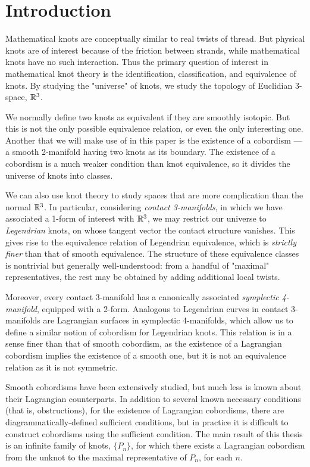 \chapter{Introduction}

Mathematical knots are conceptually similar to real twists of thread. But physical knots are of interest because of the friction between strands, while mathematical knots have no such interaction. Thus the primary question of interest in mathematical knot theory is the identification, classification, and equivalence of knots. By studying the "universe" of knots, we study the topology of Euclidian 3-space, $\mathbb{R}^3$.

We normally define two knots as equivalent if they are smoothly isotopic. But this is not the only possible equivalence relation, or even the only interesting one. Another that we will make use of in this paper is the existence of a cobordism --- a smooth 2-manifold having two knots as its boundary. The existence of a cobordism is a much weaker condition than knot equivalence, so it divides the universe of knots into classes.

We can also use knot theory to study spaces that are more complication than the normal $\mathbb{R}^3$. In particular, considering \emph{contact 3-manifolds}, in which we have associated a 1-form of interest with $\mathbb{R}^3$, we may restrict our universe to \emph{Legendrian} knots, on whose tangent vector the contact structure vanishes. This gives rise to the equivalence relation of Legendrian equivalence, which is \emph{strictly finer} than that of smooth equivalence. The structure of these equivalence classes is nontrivial but generally well-understood: from a handful of "maximal" representatives, the rest may be obtained by adding additional local twists.

Moreover, every contact 3-manifold has a canonically associated \emph{symplectic 4-manifold}, equipped with a 2-form. Analogous to Legendrian curves in contact 3-manifolds are Lagrangian surfaces in symplectic 4-manifolds, which allow us to define a similar notion of cobordism for Legendrian knots. This relation is in a sense finer than that of smooth cobordism, as the existence of a Lagrangian cobordism implies the existence of a smooth one, but it is not an equivalence relation as it is not symmetric.

Smooth cobordisms have been extensively studied, but much less is known about their Lagrangian counterparts. In addition to several known necessary conditions (that is, obstructions), for the existence of Lagrangian cobordisms, there are diagrammatically-defined sufficient conditions, but in practice it is difficult to construct cobordisms using the sufficient condition. The main result of this thesis is an infinite family of knots, $\{P_n\}$, for which there exists a Lagrangian cobordism from the unknot to the maximal representative of $P_n$, for each $n$.

